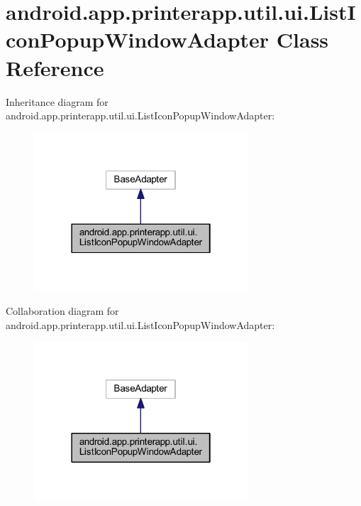 \hypertarget{classandroid_1_1app_1_1printerapp_1_1util_1_1ui_1_1_list_icon_popup_window_adapter}{}\section{android.\+app.\+printerapp.\+util.\+ui.\+List\+Icon\+Popup\+Window\+Adapter Class Reference}
\label{classandroid_1_1app_1_1printerapp_1_1util_1_1ui_1_1_list_icon_popup_window_adapter}


Inheritance diagram for android.\+app.\+printerapp.\+util.\+ui.\+List\+Icon\+Popup\+Window\+Adapter\+:
\nopagebreak
\begin{figure}[H]
\begin{center}
\leavevmode
\includegraphics[width=226pt]{classandroid_1_1app_1_1printerapp_1_1util_1_1ui_1_1_list_icon_popup_window_adapter__inherit__graph}
\end{center}
\end{figure}


Collaboration diagram for android.\+app.\+printerapp.\+util.\+ui.\+List\+Icon\+Popup\+Window\+Adapter\+:
\nopagebreak
\begin{figure}[H]
\begin{center}
\leavevmode
\includegraphics[width=226pt]{classandroid_1_1app_1_1printerapp_1_1util_1_1ui_1_1_list_icon_popup_window_adapter__coll__graph}
\end{center}
\end{figure}
